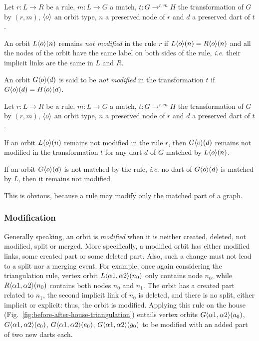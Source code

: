 \begin{definition}
    Let $r : L \longrightarrow R$ be a rule, $m : L \to G$ a match, $t : G \longrightarrow^{r,m} H$ the transformation of $G$ by $(r,m)$, $\langle o\rangle$ an orbit type, $n$ a preserved node of $r$ and $d$ a preserved dart of $t$.

    An orbit $L\langle o\rangle(n)$ remains \emph{not modified} in the rule $r$ if $L\langle o\rangle(n) = R\langle o\rangle(n)$ and all the nodes of the orbit have the same label on both sides of the rule, \textit{i.e.} their implicit links are the same in $L$ and $R$.

    An orbit $G\langle o\rangle(d)$ is said to be \emph{not modified} in the transformation $t$ if $G\langle o\rangle(d) = H\langle o\rangle(d)$.
\end{definition}

\begin{proposition}
    Let $r : L \longrightarrow R$ be a rule, $m : L \to G$ a match, $t : G \longrightarrow^{r,m} H$ the transformation of $G$ by $(r,m)$, $\langle o\rangle$ an orbit type, $n$ a preserved node of $r$ and $d$ a preserved dart of $t$.

    If an orbit $L\langle o\rangle(n)$ remains not modified in the rule $r$, then $G\langle o\rangle(d)$ remains not modified in the transformation $t$ for any dart $d$ of $G$ matched by $L\langle o\rangle(n)$.

    If an orbit $G\langle o\rangle(d)$ is not matched by the rule, \textit{i.e.} no dart of $G\langle o\rangle(d)$ is matched by $L$, then it remains not modified
\end{proposition}

\begin{proofidea}
   This is obvious, because a rule may modify only the matched part of a graph.
\end{proofidea}


\subsubsection{Modification}

Generally speaking, an orbit is \emph{modified} when it is neither created, deleted, not modified, split or merged.
More specifically, a modified orbit has either modified links, some created part or some deleted part.
Also, such a change must not lead to a split nor a merging event.
For example, once again considering the triangulation rule,  vertex orbit $L\langle\alpha 1, \alpha 2\rangle(n_{0})$ only contains  node $n_{0}$, while $R\langle\alpha 1, \alpha 2\rangle(n_{0})$ contains both nodes $n_{0}$ and $n_{1}$.
The orbit has a created part related to $n_{1}$, the second implicit link of $n_{0}$ is deleted, and there is no split, either implicit or explicit: thus, the orbit is modified.
Applying this rule on the house (Fig.~\ref{fig:before-after-house-triangulation}) entails vertex orbits $G\langle\alpha 1, \alpha 2\rangle(a_{0})$, $G\langle\alpha 1, \alpha 2\rangle(c_{0})$, $G\langle\alpha 1, \alpha 2\rangle(e_{0})$, $G\langle\alpha 1, \alpha 2\rangle(g_{0})$ to be modified with an added part of two new darts each.


